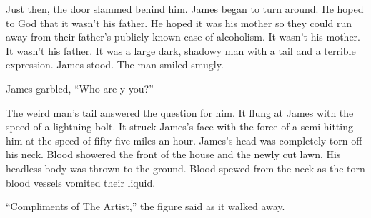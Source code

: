 Just then, the door slammed behind him. James began to turn around. He
hoped to God that it wasn't his father. He hoped it was his mother so
they could run away from their father's publicly known case of
alcoholism. It wasn't his mother. It wasn't his father. It was a large
dark, shadowy man with a tail and a terrible expression. James
stood. The man smiled smugly.

James garbled, ``Who are y-you?''

The weird man's tail answered the question for him. It flung at James
with the speed of a lightning bolt. It struck James's face with the
force of a semi hitting him at the speed of fifty-five miles an
hour. James's head was completely torn off his neck. Blood showered the
front of the house and the newly cut lawn. His headless body was thrown
to the ground. Blood spewed from the neck as the torn blood vessels
vomited their liquid.

``Compliments of The Artist,'' the figure said as it walked away.
